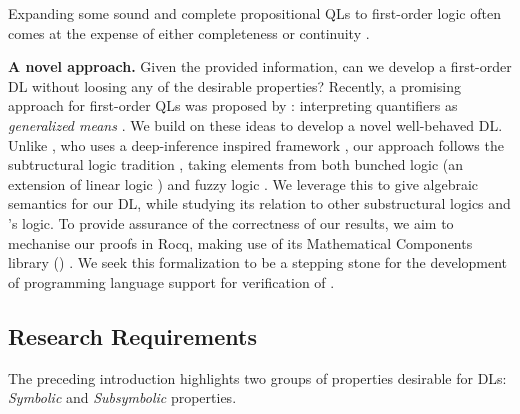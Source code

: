 Expanding some sound and complete propositional QLs to first-order logic often comes at the expense of either completeness or continuity \citep{cintula2011handbook, slusarz2023logic}.  

\textbf{A novel approach.} Given the provided information, can we develop a first-order DL without loosing any of the desirable properties?   Recently, a promising approach for first-order QLs was proposed by \citeauthor{capucci2024quantifiers}: interpreting quantifiers as \textit{generalized means} \citep{capucci2024quantifiers}. We build on these ideas to develop a novel well-behaved DL. Unlike \citeauthor{capucci2024quantifiers}, who uses a deep-inference inspired framework \citep{guglielmi2007system, guglielmi2015deep}, our approach follows the subtructural logic tradition \citep{galatos2007residuated}, taking elements from both bunched logic \citep{o1999logic} (an extension of linear logic \citep{agliano2025algebraic}) and fuzzy logic \citep{cintula2011handbook, prooffuzzy}. We leverage this to give algebraic semantics for our DL, while studying its relation to other substructural logics and \citeauthor{capucci2024quantifiers}'s logic. 
To provide assurance of the correctness of our results, we aim to mechanise our proofs in Rocq, making use of its Mathematical Components library (\mathcomp{}) \cite{mathcomp}. We seek this formalization to be a stepping stone for the development of programming language support for verification of \InAI{} \citep{vehicle}. 

\subsection{Research Requirements}
The preceding introduction highlights two groups of properties desirable for DLs: \emph{Symbolic} and \emph{Subsymbolic} properties. 

